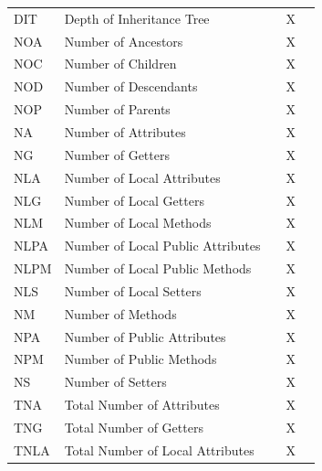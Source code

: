 \begin{table}[H]
{\begin{tabular}{lllll}
DIT         & Depth of Inheritance   Tree                   &        & X     &         \\
NOA         & Number of Ancestors                           &        & X     &         \\
NOC         & Number of Children                            &        & X     &         \\
NOD         & Number of Descendants                         &        & X     &         \\
NOP         & Number of Parents                             &        & X     &         \\
NA          & Number of Attributes                          &        & X     &         \\
NG          & Number of Getters                             &        & X     &         \\
NLA         & Number of Local Attributes                    &        & X     &         \\
NLG         & Number of Local Getters                       &        & X     &         \\
NLM         & Number of Local Methods                       &        & X     &         \\
NLPA        & Number   of Local Public Attributes           &        & X     &         \\
NLPM        & Number of Local   Public Methods              &        & X     &         \\
NLS         & Number of Local Setters                       &        & X     &         \\
NM          & Number of Methods                             &        & X     &         \\
NPA         & Number of Public   Attributes                 &        & X     &         \\
NPM         & Number of Public Methods                      &        & X     &         \\
NS          & Number of Setters                             &        & X     &         \\
TNA         & Total Number of Attributes                    &        & X     &         \\
TNG         & Total Number of Getters                       &        & X     &         \\
TNLA        & Total Number of   Local Attributes            &        & X     &         \\

\end{tabular}}
\end{table}
